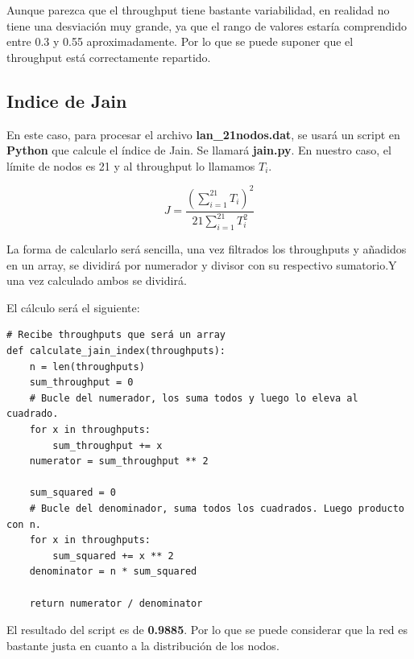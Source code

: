 \documentclass{article}
\begin{document}
Aunque parezca que el throughput tiene bastante variabilidad, en realidad no tiene una desviación muy grande, ya que el rango de valores estaría comprendido entre 0.3 y 0.55 aproximadamente. Por lo que se puede suponer que el throughput está correctamente repartido.

\subsection{Indice de Jain}

En este caso, para procesar el archivo \textbf{lan\_21nodos.dat}, se usará un script en \textbf{Python} que calcule el índice de Jain. Se llamará \textbf{jain.py}. En nuestro caso, el límite de nodos es 21 y al throughput lo llamamos \(T_i\).

\[J = \frac{\left( \sum_{i=1}^{21} T_i \right)^2}{21 \sum_{i=1}^{21} T_i^2}\]

La forma de calcularlo será sencilla, una vez filtrados los throughputs y añadidos en un array, se dividirá por numerador y divisor con su respectivo sumatorio.Y una vez calculado ambos se dividirá.

El cálculo será el siguiente:

\newpage

\begin{verbatim}
# Recibe throughputs que será un array
def calculate_jain_index(throughputs):
    n = len(throughputs)
    sum_throughput = 0
    # Bucle del numerador, los suma todos y luego lo eleva al cuadrado.
    for x in throughputs:
        sum_throughput += x
    numerator = sum_throughput ** 2

    sum_squared = 0
    # Bucle del denominador, suma todos los cuadrados. Luego producto con n.
    for x in throughputs:
        sum_squared += x ** 2
    denominator = n * sum_squared

    return numerator / denominator
\end{verbatim}

El resultado del script es de \textbf{0.9885}. Por lo que se puede considerar que la red es bastante justa en cuanto a la distribución de los nodos.
\end{document}
